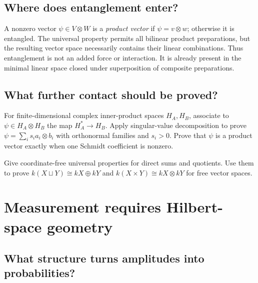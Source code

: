 \section{Where does entanglement enter?}

A nonzero vector $\psi\in V\otimes W$ is a \emph{product vector} if
$\psi=v\otimes w$; otherwise it is entangled.  The universal property
permits all bilinear product preparations, but the resulting vector space
necessarily contains their linear combinations.  Thus entanglement is not
an added force or interaction.  It is already present in the minimal linear
space closed under superposition of composite preparations.

\section{What further contact should be proved?}

\begin{exercise}
For finite-dimensional complex inner-product spaces $H_A,H_B$, associate to
$\psi\in H_A\otimes H_B$ the map $H_A^*\to H_B$.  Apply singular-value
decomposition to prove
$\psi=\sum_i s_i a_i\otimes b_i$ with orthonormal families and $s_i>0$.
Prove that $\psi$ is a product vector exactly when one Schmidt coefficient is
nonzero.
\end{exercise}

\begin{exercise}
Give coordinate-free universal properties for direct sums and quotients.
Use them to prove $k(X\sqcup Y)\cong kX\oplus kY$ and
$k(X\times Y)\cong kX\otimes kY$ for free vector spaces.
\end{exercise}


\chapter{Measurement requires Hilbert-space geometry}
\label{ch:measurement}



\section{What structure turns amplitudes into probabilities?}

